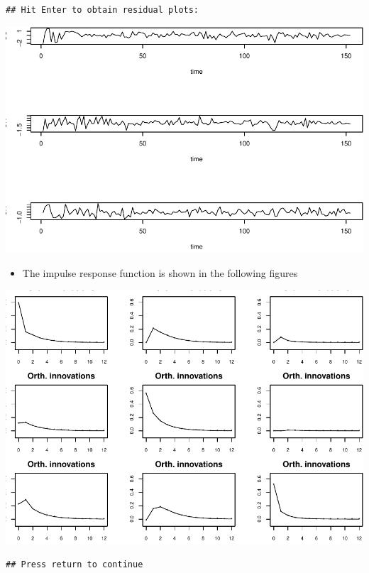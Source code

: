 \documentclass[]{article}
\providecommand{\tightlist}{%
  \setlength{\itemsep}{0pt}\setlength{\parskip}{0pt}}
\begin{document}
\begin{verbatim}
## Hit Enter to obtain residual plots:
\end{verbatim}

\includegraphics{HW3_files/figure-latex/unnamed-chunk-6-4.pdf}

\begin{itemize}
\tightlist
\item
  The impulse response function is shown in the following figures
\end{itemize}

\includegraphics{HW3_files/figure-latex/unnamed-chunk-7-1.pdf}

\begin{verbatim}
## Press return to continue
\end{verbatim}
\end{document}
